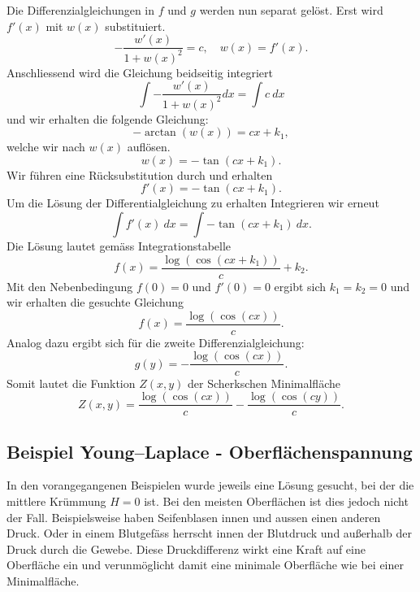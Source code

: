 \begin{refsection}
Die Differenzialgleichungen in $f$ und $g$ werden nun separat gelöst. Erst wird $f'(x)$ mit $w(x)$ substituiert. 
\begin{equation}\label{ScherkDGL1}
-\dfrac{w'(x)}{1+w(x)^2}= c  , \quad w(x)=f'(x).
\end{equation}
Anschliessend wird die Gleichung  beidseitig integriert
\begin{equation}
\int -\dfrac{w'(x)}{1+w(x)^2} dx = \int c \ dx
\end{equation}
und wir erhalten die folgende Gleichung:
\begin{equation}
-\arctan(w(x)) = cx+k_1,
\end{equation}
welche wir nach $w(x)$ auflösen.
\begin{equation}
w(x) = -\tan(cx+k_1).
\end{equation}
Wir führen eine Rücksubstitution durch und erhalten
\begin{equation}\label{SchreckDGL2}
f'(x) = -\tan(cx+k_1).
\end{equation}
Um die Lösung der Differentialgleichung zu erhalten Integrieren wir erneut
\begin{equation}
\int f'(x)\ dx = \int -\tan(cx+k_1)\ dx.
\end{equation}
 Die Lösung lautet gemäss Integrationstabelle
\begin{equation}
f(x) = \dfrac{\log(\cos(cx+k_1))}{c}+k_2.
\end{equation}
Mit den Nebenbedingung $f(0)=0$ und $f'(0)=0$ ergibt sich $k_1=k_2=0$ und wir erhalten die gesuchte Gleichung 
\begin{equation}
f(x) = \dfrac{\log(\cos(cx))}{c}.
\end{equation}
Analog dazu ergibt sich für die zweite Differenzialgleichung:
\begin{equation}
g(y) = - \dfrac{\log(\cos(cx))}{c}.
\end{equation}
Somit lautet die Funktion $Z(x,y)$ der Scherkschen Minimalfläche
\begin{equation}
Z(x,y)=\dfrac{\log(\cos(cx))}{c}-\dfrac{\log(\cos(cy))}{c}.
\end{equation}

\subsection{Beispiel Young–Laplace - Oberflächenspannung}
\label{Young-Laplace}

\label{YL-Beschreibung}
In den vorangegangenen Beispielen wurde jeweils eine Lösung gesucht, bei der die mittlere Krümmung $H=0$ ist. Bei den meisten Oberflächen ist dies jedoch nicht der Fall. Beispielsweise haben Seifenblasen innen und aussen einen anderen Druck. Oder in einem Blutgefäss herrscht innen der Blutdruck und außerhalb der Druck durch die Gewebe. Diese Druckdifferenz wirkt eine Kraft auf eine Oberfläche ein und verunmöglicht damit eine minimale Oberfläche wie bei einer Minimalfläche.


\end{refsection}
